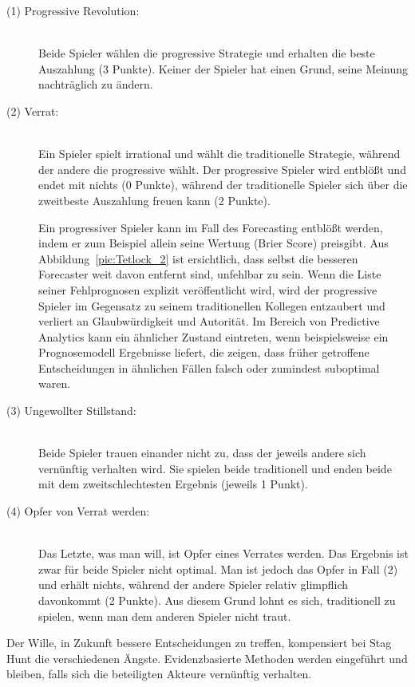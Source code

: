 \begin{description}

\item[(1) Progressive Revolution:] \hfill \\
Beide Spieler wählen die progressive Strategie und erhalten die beste Auszahlung (3 Punkte).
Keiner der Spieler hat einen Grund, seine Meinung nachträglich zu ändern.

\item[(2) Verrat:] \hfill \\
Ein Spieler spielt irrational und wählt die traditionelle Strategie, während der andere die
progressive wählt. Der progressive Spieler wird entblößt und endet mit nichts (0 Punkte),
während der traditionelle Spieler sich über die zweitbeste Auszahlung freuen kann (2 Punkte).

Ein progressiver Spieler kann im Fall des Forecasting entblößt werden, indem er zum Beispiel
allein seine Wertung (Brier Score) preisgibt. Aus Abbildung~\ref{pic:Tetlock_2} ist ersichtlich,
dass selbst die besseren Forecaster weit davon entfernt sind, unfehlbar zu sein. Wenn die Liste
seiner Fehlprognosen explizit veröffentlicht wird, wird der progressive Spieler im Gegensatz
zu seinem traditionellen Kollegen entzaubert und verliert an Glaubwürdigkeit und Autorität.
Im Bereich von Predictive Analytics kann ein ähnlicher Zustand eintreten, wenn beispielsweise
ein Prognosemodell Ergebnisse liefert, die zeigen, dass früher getroffene Entscheidungen in
ähnlichen Fällen falsch oder zumindest suboptimal waren.

\item[(3) Ungewollter Stillstand:] \hfill \\
Beide Spieler trauen einander nicht zu, dass der jeweils andere sich vernünftig verhalten wird. 
Sie spielen beide traditionell und enden beide mit dem zweitschlechtesten Ergebnis (jeweils 1 Punkt).

\item[(4) Opfer von Verrat werden:] \hfill \\
Das Letzte, was man will, ist Opfer eines Verrates werden. Das Ergebnis ist zwar für beide Spieler
nicht optimal. Man ist jedoch das Opfer in Fall (2) und erhält nichts, während der andere Spieler 
relativ glimpflich davonkommt (2 Punkte). Aus diesem Grund lohnt es sich, traditionell zu spielen, wenn man
dem anderen Spieler nicht traut.

\end{description}

Der Wille, in Zukunft bessere Entscheidungen zu treffen, kompensiert bei Stag Hunt die verschiedenen Ängste.
Evidenzbasierte Methoden werden eingeführt und bleiben, falls sich die beteiligten Akteure vernünftig verhalten.

